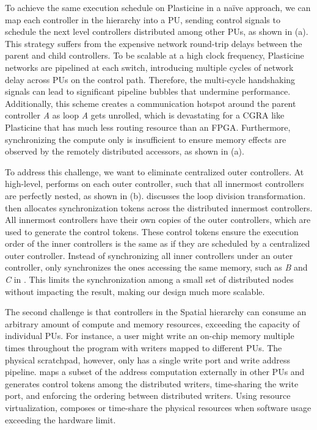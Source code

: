 To achieve the same execution schedule on Plasticine in a na\"ive approach, 
we can map each controller in the hierarchy into a PU, sending control signals to schedule the next
level controllers distributed among other PUs, as shown in  (a).
This strategy suffers from the expensive network round-trip delays between the parent and child controllers.
To be scalable at a high clock frequency, Plasticine networks are pipelined at each switch,
introducing multiple cycles of network delay across PUs on the control path.
Therefore, the multi-cycle handshaking signals can lead to significant pipeline bubbles that undermine performance.
Additionally, this scheme creates a communication hotspot around the parent controller \emph{A} as
loop \emph{A} gets unrolled, which is devastating for a CGRA
like Plasticine that has much less routing resource than an FPGA.
Furthermore, synchronizing the compute only is insufficient to ensure memory effects are observed by
the remotely distributed accessors, as shown in  (a).

To address this challenge, we want to eliminate centralized outer controllers.
At high-level, \name performs  on each outer controller, such that
all innermost controllers are perfectly nested, as shown in  (b).
 discusses the loop division transformation.
\name then allocates synchronization tokens across the distributed innermost controllers.
All innermost controllers have their own copies of the outer controllers, which are used to
generate the control tokens.
These control tokens ensure the execution order of the inner controllers is the same as if they are
scheduled by a centralized outer controller. Instead of synchronizing all inner controllers under an outer controller, \name only synchronizes the ones accessing the same memory, such as \emph{B} and
\emph{C} in . This limits the synchronization among a small set of
distributed nodes without impacting the result, 
making our design much more scalable.

The second challenge is that controllers in the Spatial hierarchy
can consume an arbitrary amount of compute and memory resources, exceeding the capacity of individual
PUs. For instance, a user might write an on-chip memory multiple times throughout the program with writers
mapped to different PUs. The physical scratchpad, however, only has a single write port and write address
pipeline. 
\name maps a subset of the address computation externally in other PUs and generates control tokens among the distributed writers, time-sharing the write port, and enforcing the
ordering between distributed writers.
Using resource virtualization, \name composes or time-share the physical resources when software usage exceeding the hardware limit.

